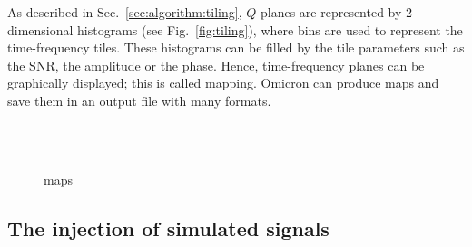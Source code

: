 As described in Sec.~\ref{sec:algorithm:tiling}, $Q$ planes are represented by 2-dimensional histograms (see Fig.~\ref{fig:tiling}), where bins are used to represent the time-frequency tiles. These histograms can be filled by the tile parameters such as the SNR, the amplitude or the phase. Hence, time-frequency planes can be graphically displayed; this is called mapping. Omicron can produce maps and save them in an output file with many formats.

\begin{figure}
  \center
    \\
    \\
   
  \caption{maps}
  \label{fig:gw150914_mapsnr}
\end{figure}

\subsection{The injection of simulated signals} \label{sec:algorithm:injections}
